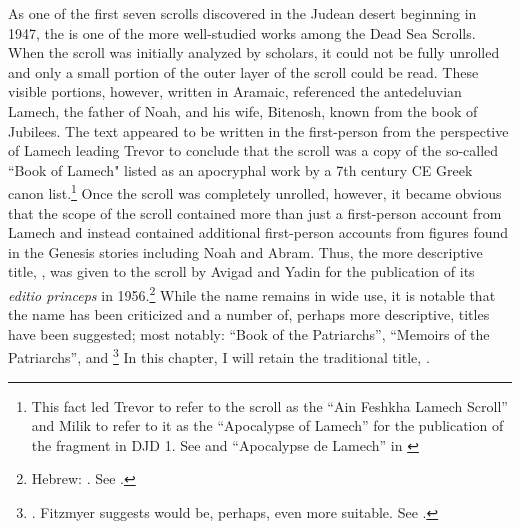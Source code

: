 
As one of the first seven scrolls discovered in the Judean desert beginning in 1947, the \ga is one of the more well-studied works among the Dead Sea Scrolls. When the scroll was initially analyzed by scholars, it could not be fully unrolled and only a small portion of the outer layer of the scroll could be read. These visible portions, however, written in Aramaic, referenced the antedeluvian Lamech, the father of Noah, and his wife, Bitenosh, known from the book of Jubilees. The text appeared to be written in the first-person from the perspective of Lamech leading Trevor to conclude that the scroll was a copy of the so-called ``Book of Lamech" listed as an apocryphal work by a 7th century CE Greek canon list.\footnote{This fact led Trevor to refer to the scroll as the ``Ain Feshkha Lamech Scroll'' and Milik to refer to it as the ``Apocalypse of Lamech'' for the publication of the fragment in DJD 1. See \cite[9--10]{trevor_basor1949} and ``Apocalypse de Lamech'' in \cite[86--87]{djd_1}} Once the scroll was completely unrolled, however, it became obvious that the scope of the scroll contained more than just a first-person account from Lamech and instead contained additional first-person accounts from figures found in the Genesis stories including Noah and Abram. Thus, the more descriptive title, , was given to the scroll by Avigad and Yadin for the publication of its \emph{editio princeps} in 1956.\footnote{Hebrew: . See \cite{avigad-yadin1956}.} While the name \ga remains in wide use, it is notable that the name has been criticized and a number of, perhaps more descriptive, titles have been suggested; most notably: ``Book of the Patriarchs''\autocite[Hebrew: . As suggested by Mazar in][379 n. 2]{flusser_ks1956}, ``Memoirs of the Patriarchs''\autocite[358]{gaster1976}, and \footnote{\cite[14 n. 1.]{milik1959}.  Fitzmyer suggests  would be, perhaps, even more suitable. See \cite[16]{fitzmyer2004}.} In this chapter, I will retain the traditional title, \ga.

